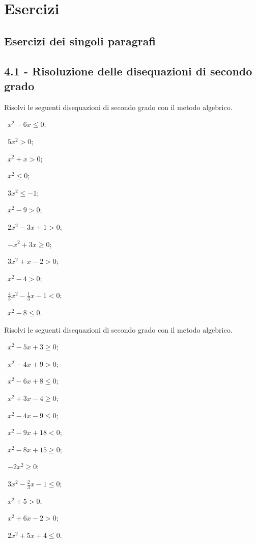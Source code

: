 \section{Esercizi}
\subsection{Esercizi dei singoli paragrafi}
\subsection*{4.1 - Risoluzione delle disequazioni di secondo grado}

\begin{esercizio}[\Ast]
 \label{ese:4.1}
Risolvi le seguenti disequazioni di secondo grado con il metodo algebrico.
\begin{multicols}{3}
 \begin{enumeratea}
 \item~$x^2-6x\le 0$;
 \item~$5x^2>0$;
 \item~$x^2+x>0$;
 \item~$x^2\le 0$;
 \item~$3x^2\le -1$;
 \item~$x^2-9>0$;
 \item~$2x^2-3x+1>0$;
 \item~$-x^2+3x\ge 0$;
 \item~$3x^2+x-2>0$;
 \item~$x^2-4>0$;
 \item~$\frac 4 3x^2-\frac 1 3x-1<0$;
 \item~$x^2-8\le 0$.
 \end{enumeratea}
 \end{multicols}
\end{esercizio}

\begin{esercizio}[\Ast]
 \label{ese:4.2}
Risolvi le seguenti disequazioni di secondo grado con il metodo algebrico.
\begin{multicols}{3}
 \begin{enumeratea}
 \item~$x^2-5x+3\ge 0$;
 \item~$x^2-4x+9>0$;
 \item~$x^2-6x+8\le 0$;
 \item~$x^2+3x-4\ge 0$;
 \item~$x^2-4x-9\le 0$;
 \item~$x^2-9x+18<0$;
 \item~$x^2-8x+15\ge 0$;
 \item~$-2x^2\ge 0$;
 \item~$3x^2-\frac 2 3x-1\le 0$;
 \item~$x^2+5>0$;
 \item~$x^2+6x-2>0$;
 \item~$2x^2+5x+4\le 0$.
 \end{enumeratea}
 \end{multicols}
\end{esercizio}

